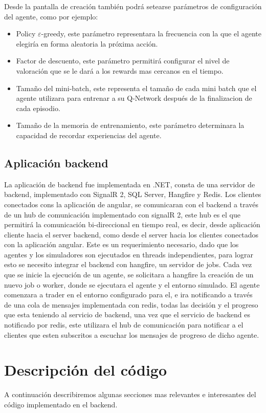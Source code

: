 Desde la pantalla de creación también podrá setearse parámetros de configuración del agente, como por ejemplo:
\begin{itemize}
	\item Policy $\varepsilon$-greedy, este parámetro representara la frecuencia con la que el agente elegiría en forma aleatoria la próxima acción.
	\item Factor de descuento, este parámetro permitirá configurar el nivel de valoración que se le dará a los rewards mas cercanos en el tiempo.
	\item Tamaño del mini-batch, este representa el tamaño de cada mini batch que el agente utilizara para entrenar a su Q-Network después de la finalizacion de cada episodio.
	\item Tamaño de la memoria de entrenamiento, este parámetro determinara la capacidad de recordar experiencias del agente.
\end{itemize}

\subsection{Aplicación backend}

La aplicación de backend fue implementada en .NET, consta de una servidor de backend, implementado con SignalR 2, SQL Server, Hangfire y Redis. 
Los clientes conectados cons la aplicación de angular, se comunicaran con el backend a través de un hub de comunicación implementado con signalR 2, este hub es el que permitirá la comunicación bi-direccional en tiempo real, es decir, desde aplicación cliente hacia el server backend, como desde el server hacia los clientes conectados con la aplicación angular. Este es un requerimiento necesario, dado que los agentes y los simuladores son ejecutados en threads independientes, para lograr esto se necesito integrar el backend con hangfire, un servidor de jobs. 
Cada vez que se inicie la ejecución de un agente, se solicitara a hangfire la creación de un nuevo job o worker, donde se ejecutara el agente y el entorno simulado. El agente comenzara a trader en el entorno configurado para el, e ira notificando a través de una cola de mensajes implementada con redis, todas las decisión y el progreso que esta teniendo al servicio de backend, una vez que el servicio de backend es notificado por redis, este utilizara el hub de comunicación para notificar a el clientes que esten subscritos a escuchar los mensajes de progreso de dicho agente.

\section{Descripción del código}
A continuación describiremos algunas secciones mas relevantes e interesantes del código implementado en el backend.

